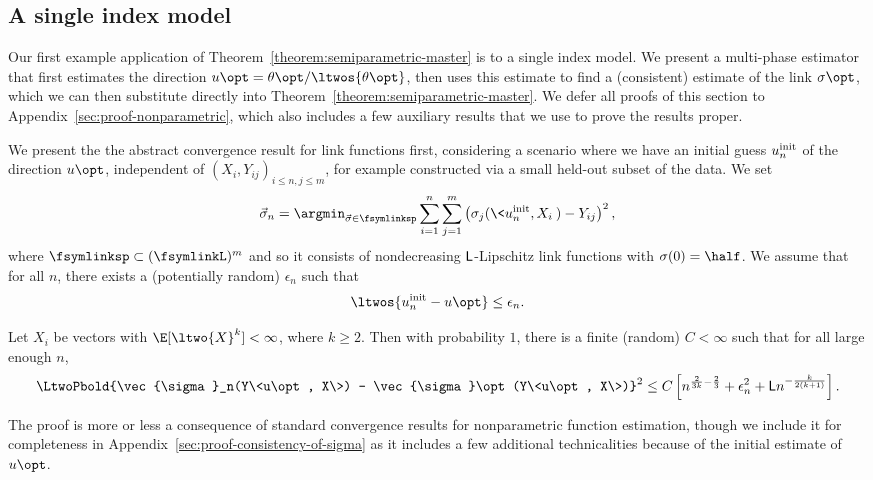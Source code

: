 \subsection{A single index model}
\label{sec:semiparametric}

Our first example application of Theorem~\ref{theorem:semiparametric-master}
is to a single index model. We present a multi-phase estimator that first
estimates the direction $u\opt = \theta\opt / \ltwos{\theta\opt}$, then uses
this estimate to find a (consistent) estimate of the link $\sigma\opt$,
which we can then substitute directly into
Theorem~\ref{theorem:semiparametric-master}.
We defer all proofs of this section to Appendix~\ref{sec:proof-nonparametric},
which also includes a few auxiliary results that we use to prove the
results proper.

We present the the abstract convergence result for link functions first,
considering a scenario where we have an initial guess $u_n^{\textup{init}}$ of the
direction $u\opt$, independent of $(X_i, Y_{ij})_{i \le n,j\le m}$, for
example constructed via a small held-out subset of the data. We set
\begin{equation*}
  \vec{\sigma}_n = \argmin_{\vec{\sigma} \in \fsymlinksp}
  \sum_{i = 1}^n\sum_{j = 1}^m
  \left(\sigma_j(\<\uinit, X_i\>) - Y_{ij}\right)^2,
\end{equation*}
where $\fsymlinksp \subset (\fsymlinkL)^m$ and so it consists of
nondecreasing $\mathsf{L}$-Lipschitz link functions with $\sigma(0) = \half$.
We assume that for all $n$, there exists a (potentially random) $\epsilon_n$
such that
\begin{equation*}
  \ltwos{\uinit - u\opt} \le \uerror_n.
\end{equation*}
\begin{proposition}
  \label{proposition:consistency-of-sigma}
  Let $X_i$ be vectors with $\E[\ltwo{X}^k] < \infty$, where
  $k \ge 2$. Then with probability $1$,
  there is a finite (random)
  $C < \infty$ such that for all large enough $n$,
  \begin{equation*}
    \LtwoPbold{\vec{\sigma}_n(Y\<u\opt, X\>)
      - \vec{\sigma}\opt(Y\<u\opt, X\>)}^2
    \le C \left[
      n^{\frac{2}{3k} - \frac{2}{3}}
      + \uerror_n^2
      + \lipconst n^{-\frac{k}{2(k + 1)}}
      \right].
  \end{equation*}
\end{proposition}
\noindent
The proof is more or less a consequence of standard convergence results
for nonparametric function estimation, though we include
it for completeness in Appendix~\ref{sec:proof-consistency-of-sigma}
as it includes a few additional technicalities because
of the initial estimate of $u\opt$.


